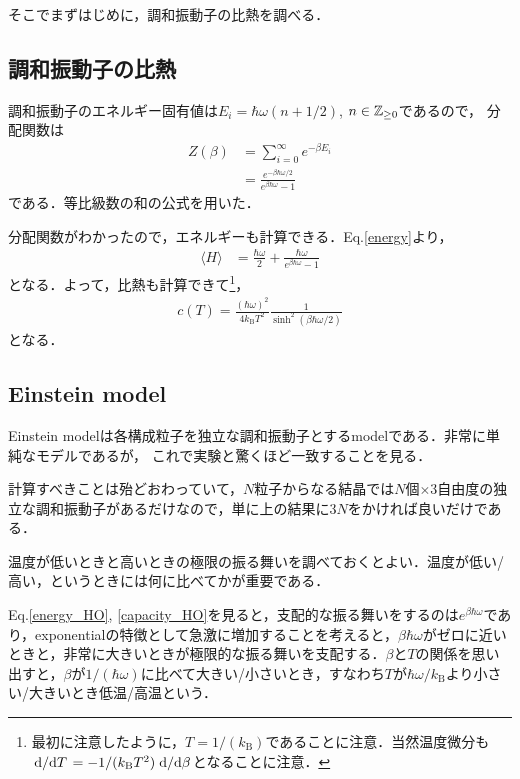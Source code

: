 	そこでまずはじめに，調和振動子の比熱を調べる．
	\subsection{調和振動子の比熱}
	調和振動子のエネルギー固有値は$E_i = \hbar\omega(n + 1/2)$, $n\in\mathbb{Z}_{\geq 0}$であるので，
	分配関数は
	\begin{align}
			Z(\beta) 
			&= \sum_{i=0}^{\infty}e^{-\beta E_i}\\
			&= \frac{e^{-\beta \hbar \omega / 2}}{e^{\beta\hbar\omega}-1}
	\end{align}
	である．等比級数の和の公式を用いた．
	
	分配関数がわかったので，エネルギーも計算できる．Eq.\eqref{energy}より，
	\begin{align}
			\langle H \rangle 
			&= \frac{\hbar\omega}{2} + \frac{\hbar \omega}{e^{\beta\hbar\omega}-1}\label{energy_HO}
	\end{align}
	となる．よって，比熱も計算できて\footnote{最初に注意したように，$T = 1/(k_{\text{B}})$であることに注意．当然温度微分も$\dv*{}{T} =-1/(k_{\text{B}}T^2) \dv*{}{\beta} $となることに注意．}，
	\begin{align}
			c(T) = \frac{(\hbar \omega)^2}{4k_{\text{B}}T^2}\frac{1}{\sinh^2 (\beta \hbar \omega/2)}\label{capacity_HO}
	\end{align}
	となる．


	\subsection{Einstein model}
	Einstein modelは各構成粒子を独立な調和振動子とするmodelである．非常に単純なモデルであるが，
	これで実験と驚くほど一致することを見る．

	計算すべきことは殆どおわっていて，$N$粒子からなる結晶では$N$個$\times$$3$自由度の独立な調和振動子があるだけなので，単に上の結果に$3N$をかければ良いだけである．

	温度が低いときと高いときの極限の振る舞いを調べておくとよい．温度が低い/高い，というときには何に比べてかが重要である．
	\begin{rem}[低温/高温]
			Eq.\eqref{energy_HO}, \eqref{capacity_HO}を見ると，支配的な振る舞いをするのは$e^{\beta\hbar\omega}$であり，exponentialの特徴として急激に増加することを考えると，$\beta\hbar\omega$がゼロに近いときと，非常に大きいときが極限的な振る舞いを支配する．$\beta$と$T$の関係を思い出すと，$\beta$が$1/(\hbar\omega)$に比べて大きい/小さいとき，すなわち$T$が$\hbar\omega/k_{\text{B}}$より小さい/大きいとき低温/高温という．
	\end{rem}

